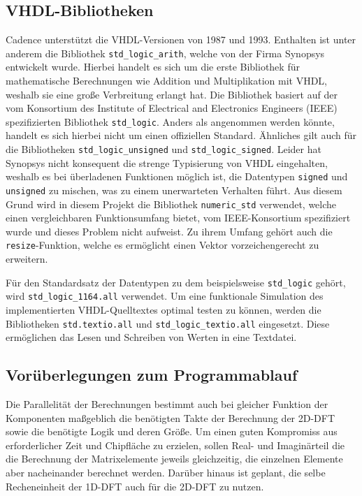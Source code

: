  
 
 \subsection{VHDL-Bibliotheken}
 Cadence unterstützt die VHDL-Versionen von 1987 und 1993. 
 Enthalten ist unter anderem die Bibliothek \texttt{std\_logic\_arith}, welche von der Firma Synopsys entwickelt wurde. Hierbei handelt es sich um die erste Bibliothek
 für mathematische Berechnungen wie Addition und Multiplikation mit VHDL, weshalb sie eine große Verbreitung erlangt hat.
 Die Bibliothek basiert auf der vom Konsortium des Institute of Electrical and Electronics Engineers (IEEE) spezifizierten Bibliothek \texttt{std\_logic}. Anders als angenommen werden könnte, handelt es sich hierbei nicht um einen offiziellen Standard.
 Ähnliches gilt auch für die Bibliotheken \texttt{std\_logic\_unsigned} und \texttt{std\_logic\_signed}.
 Leider hat Synopsys nicht konsequent die strenge Typisierung von VHDL eingehalten, weshalb es bei überladenen Funktionen möglich ist, die Datentypen \texttt{signed} und \texttt{unsigned} zu mischen, was zu einem unerwarteten Verhalten führt.
 Aus diesem Grund wird in diesem Projekt die Bibliothek \texttt{numeric\_std} verwendet, welche einen vergleichbaren Funktionsumfang bietet, vom IEEE-Konsortium spezifiziert wurde und dieses Problem nicht aufweist. Zu ihrem 
 Umfang gehört auch die \texttt{resize}-Funktion, welche es ermöglicht einen Vektor vorzeichengerecht zu erweitern.
 
Für den Standardsatz der Datentypen zu dem beispielsweise \texttt{std\_logic} gehört, wird 
\texttt{std\_logic\_1164.all} verwendet.
Um eine funktionale Simulation des implementierten VHDL-Quelltextes optimal testen zu können, werden die Bibliotheken  \texttt{std.textio.all} und 
\texttt{std\_logic\_textio.all} eingesetzt. Diese ermöglichen das Lesen und Schreiben von Werten in eine Textdatei.

 
\subsection{Vorüberlegungen zum Programmablauf}\label{sec:VorueberlegungenProgrammablauf}
Die Parallelität der Berechnungen bestimmt auch bei gleicher Funktion der Komponenten maßgeblich die benötigten Takte der Berechnung der 2D-DFT sowie die benötigte
Logik und deren Größe. 
Um einen guten Kompromiss aus erforderlicher Zeit und Chipfläche zu erzielen,
sollen  Real- und Imaginärteil die die Berechnung der Matrixelemente jeweils gleichzeitig, die einzelnen Elemente aber nacheinander berechnet werden. Darüber hinaus ist geplant, die selbe Recheneinheit der 1D-DFT auch für die 2D-DFT zu nutzen. 


